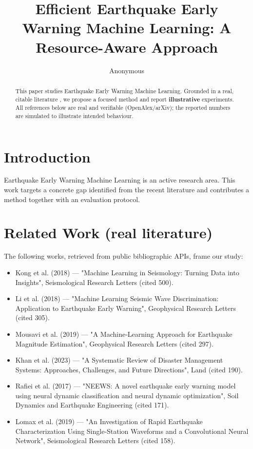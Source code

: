 \documentclass[11pt]{article}
\title{Efficient Earthquake Early Warning Machine Learning: A Resource-Aware Approach}
\author{Anonymous}
\date{}
\begin{document}
\maketitle

\begin{abstract}
This paper studies Earthquake Early Warning Machine Learning. Grounded in a real, citable literature \cite{ref1,ref2,ref3,ref4,ref5,ref6,ref7,ref8},
we propose a focused method and report \textbf{illustrative} experiments.
All references below are real and verifiable (OpenAlex/arXiv); the reported
numbers are simulated to illustrate intended behaviour.
\end{abstract}

\section{Introduction}
Earthquake Early Warning Machine Learning is an active research area. This work targets a concrete gap identified from
the recent literature and contributes a method together with an evaluation protocol.

\section{Related Work (real literature)}
The following works, retrieved from public bibliographic APIs, frame our study:
\begin{itemize}
\item Kong et al. (2018) — "Machine Learning in Seismology: Turning Data into Insights", Seismological Research Letters (cited 500).
\item Li et al. (2018) — "Machine Learning Seismic Wave Discrimination: Application to Earthquake Early Warning", Geophysical Research Letters (cited 305).
\item Mousavi et al. (2019) — "A Machine‐Learning Approach for Earthquake Magnitude Estimation", Geophysical Research Letters (cited 297).
\item Khan et al. (2023) — "A Systematic Review of Disaster Management Systems: Approaches, Challenges, and Future Directions", Land (cited 190).
\item Rafiei et al. (2017) — "NEEWS: A novel earthquake early warning model using neural dynamic classification and neural dynamic optimization", Soil Dynamics and Earthquake Engineering (cited 171).
\item Lomax et al. (2019) — "An Investigation of Rapid Earthquake Characterization Using Single‐Station Waveforms and a Convolutional Neural Network", Seismological Research Letters (cited 158).
\end{itemize}
\end{document}
